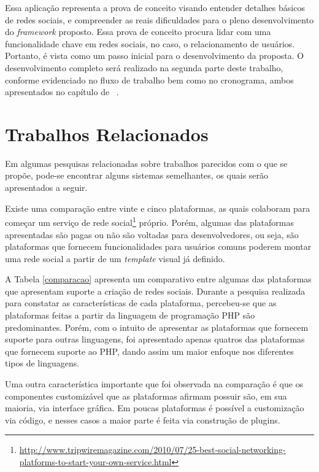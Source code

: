 Essa aplicação representa a prova de conceito visando entender detalhes básicos de redes sociais, e compreender as reais dificuldades para o pleno desenvolvimento do \textit{framework} proposto. Essa prova de conceito procura lidar com uma funcionalidade chave em redes sociais, no caso, o relacionamento de usuários. Portanto, é vista como um passo inicial para o desenvolvimento da proposta. O desenvolvimento completo será realizado na segunda parte deste trabalho, conforme evidenciado no fluxo de trabalho bem como no cronograma, ambos apresentados no capítulo de ~.

\section{Trabalhos Relacionados}

Em algumas pesquisas relacionadas sobre trabalhos parecidos com o que se propõe, pode-se encontrar alguns sistemas semelhantes, os quais serão apresentados a seguir.

Existe uma comparação entre vinte e cinco plataformas, as quais colaboram para começar um serviço de rede social\footnote{\url{http://www.tripwiremagazine.com/2010/07/25-best-social-networking-platforms-to-start-your-own-service.html}}  próprio. Porém, algumas das plataformas apresentadas são pagas ou não são voltadas para desenvolvedores, ou seja, são plataformas que fornecem funcionalidades para usuários comuns poderem montar uma rede social a partir de um \textit{template} visual já definido.

A Tabela \ref{comparacao} apresenta um comparativo entre algumas das plataformas que apresentam suporte a criação de redes sociais. Durante a pesquisa realizada para constatar as características de cada plataforma, percebeu-se que as plataformas feitas a partir da linguagem de programação PHP são predominantes. Porém, com o intuito de apresentar as plataformas que fornecem suporte para outras linguagens, foi apresentado apenas quatros das plataformas que fornecem suporte ao PHP, dando assim um maior enfoque nos diferentes tipos de linguagens.

Uma outra característica importante que foi observada na comparação é que os componentes customizável que as plataformas afirmam possuir são, em sua maioria, via interface gráfica. Em poucas plataformas é possível a customização via código, e nesses casos a maior parte é feita via construção de plugins.

\newpage

